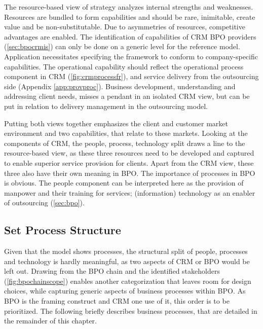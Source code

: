 	The resource-based view of strategy \citep{wernerfelt1984resource} analyzes internal strengths and weaknesses. Resources are bundled to form capabilities and should be rare, inimitable, create value and be non-substitutable. Due to asymmetries of resources, competitive advantages are enabled. The identification of capabilities of CRM BPO providers (\cf \ref{sec:bpocrmis}) can only be done on a generic level for the reference model. Application necessitates specifying the framework to conform to company-specific capabilities. The operational capability should reflect the operational process component in CRM (\cf \Fig \ref{fig:crmprocessfr}), and service delivery from the outsourcing side (\cf Appendix \ref{app:provproc}). Business development, \ie understanding and addressing client needs, misses a pendant in an isolated CRM view, but can be put in relation to delivery management in the outsourcing model. 
	
	Putting both views together emphasizes the client and customer market environment and two capabilities, that relate to these markets. %
	Looking at the components of \acrshort{CRM}, the people, process, technology split draws a line to the resource-based view, as these three resources need to be developed and captured to enable superior service provision for clients. Apart from the  \acrshort{CRM} view, these three also have their own meaning in \acrshort{BPO}. The importance of processes in  \acrshort{BPO} is obvious. The people component can be interpreted here as the provision of manpower and their training for services; (information) technology as an enabler of outsourcing (\cf \ref{sec:bpo}). 
	
		
	\subsection{Set Process Structure}
	\label{sec:procstr}
	Given that the model shows processes, the structural split of people, processes and technology is hardly meaningful, as two aspects of  \acrshort{CRM} or \acrshort{BPO} would be left out. Drawing from the BPO chain and the identified stakeholders (\cf \Fig \ref{fig:bpochainscope}) enables another categorization that leaves room for design choices, while capturing generic aspects of business processes within \acrshort{BPO}. As \acrshort{BPO} is the framing construct and  \acrshort{CRM} one use of it, this order is to be prioritized. The following briefly describes business processes, that are detailed in the remainder of this chapter.
	
